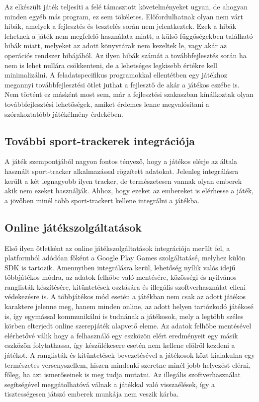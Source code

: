Az elkészült játék teljesíti a felé támasztott követelményeket ugyan, de ahogyan minden egyéb más program, ez sem tökéletes. 
Előfordulhatnak olyan nem várt hibák, amelyek a fejlesztés és tesztelés során nem jelentkeztek. 
Ezek a hibák lehetnek a játék nem megfelelő használata miatt, a külső függőségekben található hibák miatt, melyeket az adott könyvtárak nem kezeltek le, vagy akár az operációs rendszer hibájából. 
Az ilyen hibák számát a továbbfejlesztés során ha nem is lehet nullára csökkenteni, de a lehetséges legkisebb értékre kell minimalizálni. 
A feladatspecifikus programokkal ellentétben egy játékhoz megannyi továbbfejlesztési ötlet juthat a fejlesztő de akár a játékos eszébe is. 
Nem történt ez másként most sem, már a fejlesztési szakaszban kínálkoztak olyan továbbfejlesztési lehetőségek, amiket érdemes lenne megvalósítani a szórakoztatóbb játékélmény érdekében. 

\subsection*{További sport-trackerek integrációja}
\label{sporttrackerintegration}
A játék szempontjából nagyon fontos tényező, hogy a játékos elérje az általa használt sport-tracker alkalmazással rögzített adatokat. 
Jelenleg integrálásra került a két legnagyobb ilyen tracker, de természetesen vannak olyan emberek akik nem ezeket használják. 
Ahhoz, hogy ezeket az embereket is elérhesse a játék, a jövőben minél több sport-trackert kellene integrálni a játékba. 

\subsection*{Online játékszolgáltatások}
\label{onlinegameingservice}
Első ilyen ötletként az online játékszolgáltatások integrációja merült fel, a platformból adódóan főként a Google Play Games szolgáltatásé, melyhez külön SDK is tartozik. 
Amennyiben integrálásra kerül, lehetőség nyílik valós idejű többjátékos módra, az adatok felhőbe való mentésére, közösségi és nyilvános ranglisták készítésére, kitüntetések osztására és illegális szoftverhasználat elleni védekezésre is. 
A többjátékos mód esetén a játékban nem csak az adott játékos karaktere jelenne meg, hanem minden online, az adott helyen tartózkodó játékosé is, így egymással kommunikálni is tudnának a játékosok, mely a legtöbb széles körben elterjedt online szerepjáték alapvető eleme. 
Az adatok felhőbe mentésével elérhetővé válik hogy a felhasználó egy eszközön elért eredményeit egy másik eszközön folytathassa, így készülékcsere esetén nem kellene elölről kezdeni a játékot. 
A ranglisták és kitüntetések bevezetésével a játékosok közt kialakulna egy természetes versenyszellem, hiszen mindenki szeretne minél jobb helyezést elérni, főleg, ha azt ismerőseinek is meg tudja mutatni. 
Az illegális szoftverhasználat segítségével meggátolhatóvá válnak a játékkal való visszaélések, így a tisztességesen játszó emberek munkája nem veszik kárba.  

